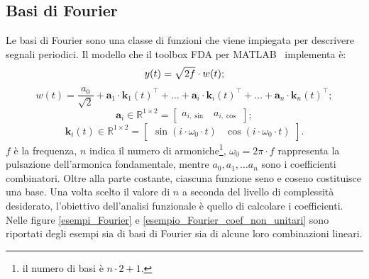 \subsection[Basi di Fourier]{Basi di Fourier}
Le basi di Fourier sono una classe di funzioni che viene impiegata per descrivere segnali periodici. Il modello che il toolbox FDA per MATLAB~\citep{paper_FDA_toolbox} implementa è:
\[
	y(t) = \sqrt{2f}\cdot w(t)\\;
\]
\[
	w(t) = \frac{a_0}{\sqrt{2}} + \mathbf{a}_1\cdot \mathbf{k}_1(t)^\top +\dots + \mathbf{a}_i\cdot \mathbf{k}_i(t)^\top + \dots + \mathbf{a}_n\cdot \mathbf{k}_n(t)^\top;
\]
\[
	\mathbf{a}_i\in\mathbb{R}^{1\times2} =
	\begin{bmatrix}
		a_{i, \sin} & a_{i, \cos}
	\end{bmatrix};
\]
\[
	\mathbf{k}_i(t)\in\mathbb{R}^{1\times 2} =
	\begin{bmatrix}
		\sin\left(i\cdot\omega_0\cdot t\right) & \cos\left(i\cdot\omega_0\cdot t\right)
	\end{bmatrix}.
\]
$f$ è la frequenza, $n$ indica il numero di armoniche\footnote{il numero di basi è $n\cdot 2 + 1$.}, $\omega_0 = 2\pi\cdot f$ rappresenta la pulsazione dell'armonica fondamentale, mentre $a_0, a_1,\dots a_n$ sono i coefficienti combinatori. Oltre alla parte costante, ciascuna funzione seno e coseno costituisce una base. Una volta scelto il valore di $n$ a seconda del livello di complessità desiderato, l'obiettivo dell'analisi funzionale è quello di calcolare i coefficienti. Nelle figure \ref{esempi_Fourier} e \ref{esempio_Fourier_coef_non_unitari} sono riportati degli esempi sia di basi di Fourier sia di alcune loro combinazioni lineari.

